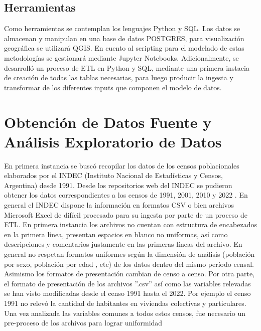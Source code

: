 \documentclass{article}
\theoremstyle{mytheoremstyle}
\theoremstyle{mytheoremstyle}
\theoremstyle{myproblemstyle}
\begin{document}
\subsection{Herramientas }
Como herramientas se contemplan los lenguajes Python y SQL. Los datos se almacenan y manipulan en una base de datos POSTGRES,
 para visualización geográfica se utilizará QGIS. En cuento al scripting para el modelado de estas metodologías
 se gestionará mediante Jupyter Notebooks.\newline\newline
Adicionalmente, se desarrolló un proceso de ETL en Python y SQL, mediante una primera instacia de creación de todas las tablas necesarias, 
para luego producir la ingesta y transformar de los diferentes inputs que componen el modelo de datos.


\section{Obtención de Datos Fuente y Análisis Exploratorio de Datos}
 En primera instancia se buscó recopilar los datos de los censos poblacionales 
elaborados por el INDEC (Instituto Nacional de Estadísticas y Censos, Argentina) desde 1991.
Desde los repositorios web del INDEC se pudieron obtener los datos correspondientes a  los censos de  1991, 2001, 2010 y 2022
   .
En general el INDEC dispone la información en formatos CSV o 
 bien archivos Microsoft Excel de difícil procesado para su ingesta por parte de un  proceso de ETL.\newline\newline
  En primera instancia los archivos no cuentan con estructura de encabezados en la primera línea, presentan espacios en blanco no uniformas, 
así como descripciones y comentarios justamente en las primeras líneas del archivo.
  En general no respetan formatos uniformes según la dimensión de análisis (población por sexo, población por edad , etc) 
de los datos dentro del mismo período censal. Asimismo los formatos de presentación cambian de censo a censo.
Por otra parte, el formato de presentación de los  archivos ''.csv'' así como  las variables relevadas se han 
visto modificadas desde el censo 1991 hasta el 2022. Por ejemplo el censo 1991 no relevó la cantidad de habitantes
en viviendas colectivas y particulares.\newline\newline
Una vez analizada las variables comunes a todos estos censos, fue necesario un pre-proceso de los archivos para lograr uniformidad 
\end{document}
